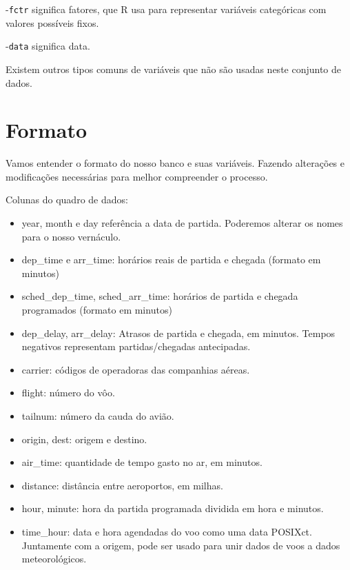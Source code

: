 \documentclass[a4paper]{book}
\newenvironment{Shaded}{\begin{snugshade}}{\end{snugshade}}
\newcommand{\DataTypeTok}[1]{\textcolor[rgb]{0.13,0.29,0.53}{#1}}
\newcommand{\KeywordTok}[1]{\textcolor[rgb]{0.13,0.29,0.53}{\textbf{#1}}}
\newcommand{\NormalTok}[1]{#1}
\newcommand{\OperatorTok}[1]{\textcolor[rgb]{0.81,0.36,0.00}{\textbf{#1}}}
\newcommand{\StringTok}[1]{\textcolor[rgb]{0.31,0.60,0.02}{#1}}
\begin{document}
-\texttt{fctr} significa fatores, que R usa para representar variáveis categóricas com valores possíveis fixos.

-\texttt{data} significa data.

Existem outros tipos comuns de variáveis que não são usadas neste conjunto de dados.

\hypertarget{formato}{%
\section{Formato}\label{formato}}

Vamos entender o formato do nosso banco e suas variáveis. Fazendo alterações e modificações necessárias para melhor compreender o processo.

Colunas do quadro de dados:

\begin{itemize}
\item
  year, month e day referência a data de partida. Poderemos alterar os nomes para o nosso vernáculo.
\item
  dep\_time e arr\_time: horários reais de partida e chegada (formato em minutos)
\item
  sched\_dep\_time, sched\_arr\_time: horários de partida e chegada programados (formato em minutos)
\item
  dep\_delay, arr\_delay: Atrasos de partida e chegada, em minutos. Tempos negativos representam partidas/chegadas antecipadas.
\item
  carrier: códigos de operadoras das companhias aéreas.
\item
  flight: número do vôo.
\item
  tailnum: número da cauda do avião.
\item
  origin, dest: origem e destino.
\item
  air\_time: quantidade de tempo gasto no ar, em minutos.
\item
  distance: distância entre aeroportos, em milhas.
\item
  hour, minute: hora da partida programada dividida em hora e minutos.
\item
  time\_hour: data e hora agendadas do voo como uma data POSIXct. Juntamente com a origem, pode ser usado para unir dados de voos a dados meteorológicos.
\end{itemize}

\begin{Shaded}
\end{Shaded}
\end{document}
